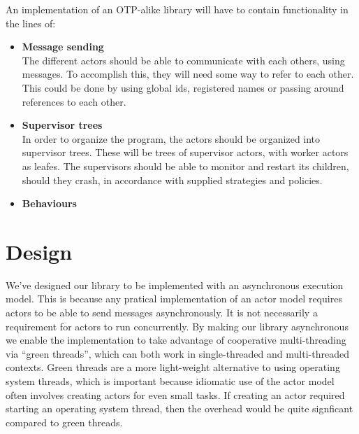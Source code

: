 \documentclass[a4paper]{article}
\begin{document}
An implementation of an OTP-alike library will have to contain functionality in the lines of:
\begin{itemize}
\item \textbf{Message sending}\\
  The different actors should be able to communicate with each others, using
  messages. To accomplish this, they will need some way to refer to each other.
  This could be done by using global ids, registered names or passing around
  references to each other.
\item \textbf{Supervisor trees}\\
  In order to organize the program, the actors should be organized into
  supervisor trees. These will be trees of supervisor actors, with worker actors
  as leafes. The supervisors should be able to monitor and restart its children,
  should they crash, in accordance with supplied strategies and policies.
\item \textbf{Behaviours}
\end{itemize}


\section{Design}

We've designed our library to be implemented with an asynchronous execution model.
This is because any pratical implementation of an actor model requires actors to
be able to send messages asynchronously. It is not necessarily a requirement for
actors to run concurrently. By making our library asynchronous we enable the
implementation to take advantage of cooperative multi-threading via
``green threads'', which can both work in single-threaded and multi-threaded
contexts. Green threads are a more light-weight alternative to using
operating system threads, which is important because idiomatic use of the actor
model often involves creating actors for even small tasks. If creating an actor
required starting an operating system thread, then the overhead would be quite
signficant compared to green threads.\\
\end{document}
